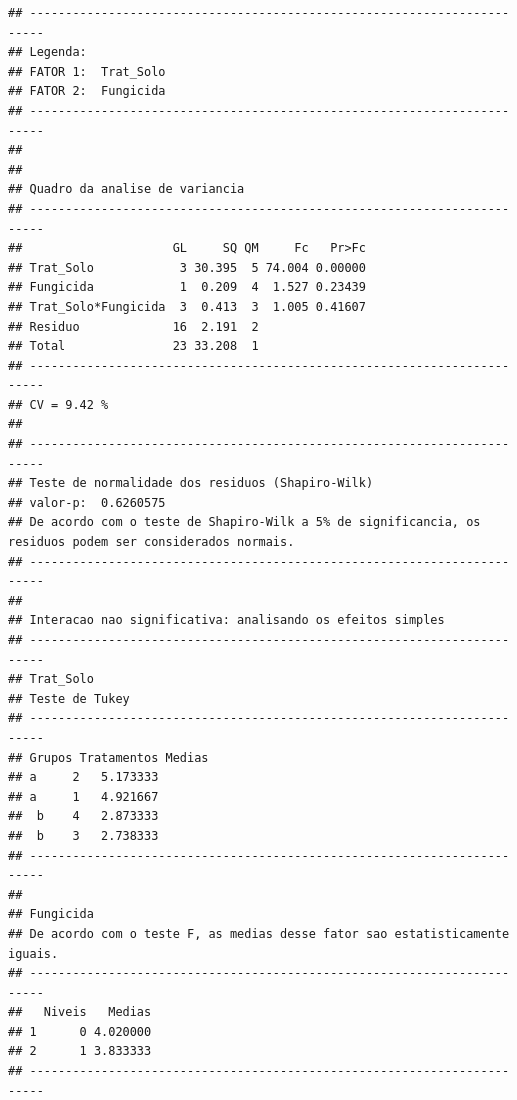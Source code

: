 \documentclass[
]{article}
\begin{document}
\begin{verbatim}
## ------------------------------------------------------------------------
## Legenda:
## FATOR 1:  Trat_Solo 
## FATOR 2:  Fungicida 
## ------------------------------------------------------------------------
## 
## 
## Quadro da analise de variancia
## ------------------------------------------------------------------------
##                     GL     SQ QM     Fc   Pr>Fc
## Trat_Solo            3 30.395  5 74.004 0.00000
## Fungicida            1  0.209  4  1.527 0.23439
## Trat_Solo*Fungicida  3  0.413  3  1.005 0.41607
## Residuo             16  2.191  2               
## Total               23 33.208  1               
## ------------------------------------------------------------------------
## CV = 9.42 %
## 
## ------------------------------------------------------------------------
## Teste de normalidade dos residuos (Shapiro-Wilk)
## valor-p:  0.6260575 
## De acordo com o teste de Shapiro-Wilk a 5% de significancia, os residuos podem ser considerados normais.
## ------------------------------------------------------------------------
## 
## Interacao nao significativa: analisando os efeitos simples
## ------------------------------------------------------------------------
## Trat_Solo
## Teste de Tukey
## ------------------------------------------------------------------------
## Grupos Tratamentos Medias
## a     2   5.173333 
## a     1   4.921667 
##  b    4   2.873333 
##  b    3   2.738333 
## ------------------------------------------------------------------------
## 
## Fungicida
## De acordo com o teste F, as medias desse fator sao estatisticamente iguais.
## ------------------------------------------------------------------------
##   Niveis   Medias
## 1      0 4.020000
## 2      1 3.833333
## ------------------------------------------------------------------------
\end{verbatim}
\end{document}
